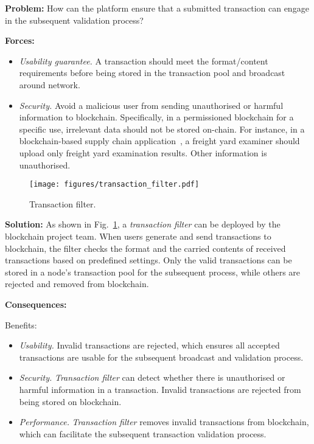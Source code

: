 \documentclass{article}
\begin{document}
\vspace{0.5em}\noindent \textbf{Problem:} How can the platform ensure that a submitted transaction can engage in the subsequent validation process?




\vspace{0.5em}\noindent \textbf{Forces:} 

\begin{itemize}
  \item \textit{Usability guarantee.} A transaction should meet the format/content requirements before being stored in the transaction pool and broadcast around network.
  

  \item \textit{Security.} Avoid a malicious user from sending unauthorised or harmful information to blockchain. Specifically,  in a permissioned blockchain for a specific use, irrelevant data should not be stored on-chain. For instance, in a blockchain-based supply chain application~\cite{XU2019399}, a freight yard examiner should upload only freight yard examination results. Other information is unauthorised.
\end{itemize}

\begin{figure}[!ht]
	\centering
	\texttt{[image: figures/transaction\_filter.pdf]}	
	\caption{Transaction filter.}
	\label{pic:transaction_filter}
\end{figure}

\vspace{0.5em}\noindent \textbf{Solution:} As shown in Fig.~\ref{pic:transaction_filter}, a \textit{transaction filter} can be deployed by the blockchain project team. When users generate and send transactions to blockchain, the filter checks the format and the carried contents of received transactions based on predefined settings. Only the valid transactions can be stored in a node's transaction pool for the subsequent process, while others are rejected and removed from blockchain. 


\vspace{0.5em}\noindent \textbf{Consequences:} 

Benefits:
\begin{itemize}
  \item \textit{Usability.} Invalid transactions are rejected, which ensures all accepted transactions are usable for the subsequent broadcast and validation process.
  
  \item \textit{Security.} \textit{Transaction filter} can detect whether there is unauthorised or harmful information in a transaction. Invalid transactions are rejected from being stored on blockchain.
  
  \item \textit{Performance.} \textit{Transaction filter} removes invalid transactions from blockchain, which can facilitate the subsequent transaction validation process.
\end{itemize}
\end{document}
